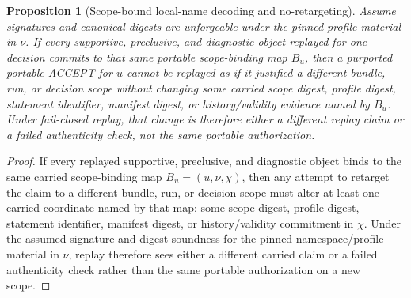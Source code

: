 \documentclass[11pt]{article}
\newtheorem{proposition}{Proposition}
\begin{document}
\begin{proposition}[Scope-bound local-name decoding and no-retargeting]
Assume signatures and canonical digests are unforgeable under the pinned profile material in $\nu$.
If every supportive, preclusive, and diagnostic object replayed for one decision commits to that same portable scope-binding map $B_u$, then a purported portable \textsf{ACCEPT} for $u$ cannot be replayed as if it justified a different bundle, run, or decision scope without changing some carried scope digest, profile digest, statement identifier, manifest digest, or history/validity evidence named by $B_u$.
Under fail-closed replay, that change is therefore either a different replay claim or a failed authenticity check, not the same portable authorization.
\end{proposition}

\begin{proof}
If every replayed supportive, preclusive, and diagnostic object binds to the same carried scope-binding map $B_u=(u,\nu,\chi)$, then any attempt to retarget the claim to a different bundle, run, or decision scope must alter at least one carried coordinate named by that map: some scope digest, profile digest, statement identifier, manifest digest, or history/validity commitment in $\chi$.
Under the assumed signature and digest soundness for the pinned namespace/profile material in $\nu$, replay therefore sees either a different carried claim or a failed authenticity check rather than the same portable authorization on a new scope.
\end{proof}
\end{document}
